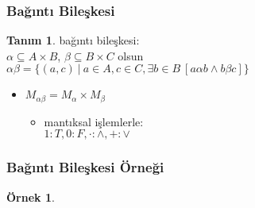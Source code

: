 \documentclass[dvipsnames]{beamer}
\theoremstyle{definition}
\newtheorem{tanim}[theorem]{Tanım}
\theoremstyle{example}
\newtheorem{ornek}[theorem]{Örnek}
\theoremstyle{plain}
\begin{document}
\begin{frame}
  \frametitle{Bağıntı Bileşkesi}

  \begin{tanim}
    \alert{bağıntı bileşkesi}:\\
      $\alpha \subseteq A \times B$, $\beta \subseteq B \times C$ olsun\\
      $\alpha \beta = \{(a,c)~|~a \in A, c \in C,
                \exists b \in B~[a \alpha b \wedge b \beta c]\}$
  \end{tanim}

  \begin{itemize}
    \item $M_{\alpha \beta} = M_{\alpha} \times M_{\beta}$
    \begin{itemize}
      \item mantıksal işlemlerle:\\
        $1:T, 0:F, \cdot:\wedge, +:\vee$
    \end{itemize}
  \end{itemize}
\end{frame}

\begin{frame}
  \frametitle{Bağıntı Bileşkesi Örneği}

  \begin{ornek}
    \begin{columns}
      \begin{center}
      \end{center}

      \begin{center}
      \end{center}
    \end{columns}
  \end{ornek}
\end{frame}
\end{document}
